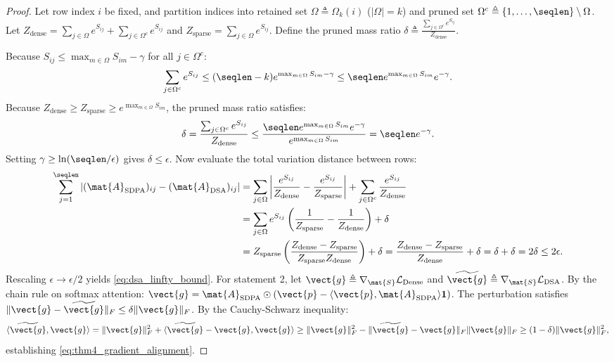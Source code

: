 \begin{proof}
Let row index $i$ be fixed, and partition indices into retained set $\Omega \triangleq \Omega_k(i)$ ($|\Omega| = k$) and pruned set $\Omega^c \triangleq \{1, \dots, \seqlen\} \setminus \Omega$. Let $Z_{\text{dense}} = \sum_{j \in \Omega} e^{S_{ij}} + \sum_{j \in \Omega^c} e^{S_{ij}}$ and $Z_{\text{sparse}} = \sum_{j \in \Omega} e^{S_{ij}}$. Define the pruned mass ratio $\delta \triangleq \frac{\sum_{j \in \Omega^c} e^{S_{ij}}}{Z_{\text{dense}}}$.

Because $S_{ij} \le \max_{m \in \Omega} S_{im} - \gamma$ for all $j \in \Omega^c$:
\begin{equation}
\sum_{j \in \Omega^c} e^{S_{ij}} \le (\seqlen - k) e^{\max_{m \in \Omega} S_{im} - \gamma} \le \seqlen e^{\max_{m \in \Omega} S_{im}} e^{-\gamma}.
\end{equation}
Because $Z_{\text{dense}} \ge Z_{\text{sparse}} \ge e^{\max_{m \in \Omega} S_{im}}$, the pruned mass ratio satisfies:
\begin{equation}
\delta = \frac{\sum_{j \in \Omega^c} e^{S_{ij}}}{Z_{\text{dense}}} \le \frac{\seqlen e^{\max_{m \in \Omega} S_{im}} e^{-\gamma}}{e^{\max_{m \in \Omega} S_{im}}} = \seqlen e^{-\gamma}.
\end{equation}
Setting $\gamma \ge \ln(\seqlen / \epsilon)$ gives $\delta \le \epsilon$. Now evaluate the total variation distance between rows:
\begin{align}
\sum_{j=1}^{\seqlen} \left| (\mat{A}_{\text{SDPA}})_{ij} - (\mat{A}_{\text{DSA}})_{ij} \right| &= \sum_{j \in \Omega} \left| \frac{e^{S_{ij}}}{Z_{\text{dense}}} - \frac{e^{S_{ij}}}{Z_{\text{sparse}}} \right| + \sum_{j \in \Omega^c} \frac{e^{S_{ij}}}{Z_{\text{dense}}} \nonumber \\
&= \sum_{j \in \Omega} e^{S_{ij}} \left( \frac{1}{Z_{\text{sparse}}} - \frac{1}{Z_{\text{dense}}} \right) + \delta \nonumber \\
&= Z_{\text{sparse}} \left( \frac{Z_{\text{dense}} - Z_{\text{sparse}}}{Z_{\text{sparse}} Z_{\text{dense}}} \right) + \delta = \frac{Z_{\text{dense}} - Z_{\text{sparse}}}{Z_{\text{dense}}} + \delta = \delta + \delta = 2\delta \le 2\epsilon.
\end{align}
Rescaling $\epsilon \to \epsilon / 2$ yields \eqref{eq:dsa_linfty_bound}. For statement 2, let $\vect{g} \triangleq \nabla_{\mat{S}} \mathcal{L}_{\text{Dense}}$ and $\widetilde{\vect{g}} \triangleq \nabla_{\mat{S}} \mathcal{L}_{\text{DSA}}$. By the chain rule on softmax attention: $\vect{g} = \mat{A}_{\text{SDPA}} \odot (\vect{p} - \langle \vect{p}, \mat{A}_{\text{SDPA}} \rangle \mathbf{1})$. The perturbation satisfies $\|\vect{g} - \widetilde{\vect{g}}\|_F \le \delta \|\vect{g}\|_F$. By the Cauchy-Schwarz inequality:
\begin{equation}
\langle \widetilde{\vect{g}}, \vect{g} \rangle = \|\vect{g}\|_F^2 + \langle \widetilde{\vect{g}} - \vect{g}, \vect{g} \rangle \ge \|\vect{g}\|_F^2 - \|\widetilde{\vect{g}} - \vect{g}\|_F \|\vect{g}\|_F \ge (1 - \delta) \|\vect{g}\|_F^2,
\end{equation}
establishing \eqref{eq:thm4_gradient_alignment}.
\end{proof}

